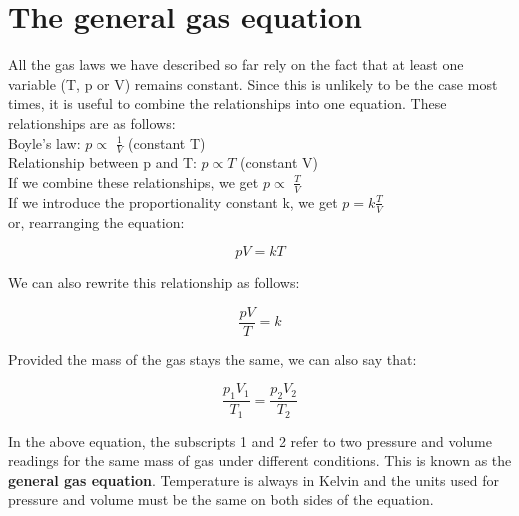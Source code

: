 \section{The general gas equation}
\label{sec:gases:general equation}

All the gas laws we have described so far rely on the fact that at least one variable (T, p or V) remains constant. Since this is unlikely to be the case most times, it is useful to combine the relationships into one equation. These relationships are as follows:\\

Boyle's law: $p \propto$ $\frac{1}{V}$ (constant T)\\

Relationship between p and T: $p \propto T$ (constant V)\\

If we combine these relationships, we get $p \propto$ $\frac{T}{V}$\\

If we introduce the proportionality constant k, we get $p = k \frac{T}{V}$\\

or, rearranging the equation:

\begin{equation*}
pV = kT
\end{equation*}

We can also rewrite this relationship as follows:

\begin{equation*}
\frac{pV}{T} = k
\end{equation*}

Provided the mass of the gas stays the same, we can also say that:

\begin{equation*}
\frac{p_{1}V_{1}}{T_{1}} = \frac{p_{2}V_{2}}{T_{2}}
\end{equation*}

In the above equation, the subscripts 1 and 2 refer to two pressure and volume readings for the same mass of gas under different conditions. This is known as the \textbf{general gas equation}. Temperature is always in Kelvin and the units used for pressure and volume must be the same on both sides of the equation.


